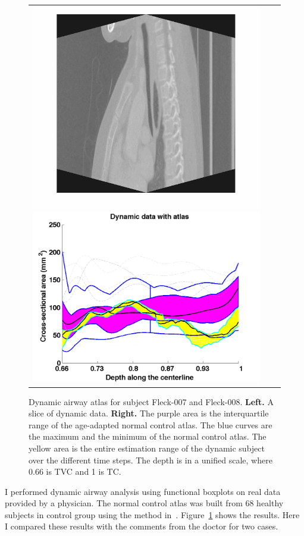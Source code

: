 \begin{figure}[tb]
\begin{center}
\begin{tabular}{ccc}
    \includegraphics[height=\figheight] {fig/Fleck_008.png}
    \includegraphics[width=\figwidth] {fig/Fleck_008_wfbplot.png} \\
    \end{tabular}
    \caption{ \label{fig:Fleck} Dynamic airway atlas for subject Fleck-007 and Fleck-008. {\bf Left.} A slice of dynamic data. {\bf Right.} The purple area is the interquartile range of the age-adapted normal control atlas. The blue curves are the maximum and the minimum of the normal control atlas. The yellow area is the entire estimation range of the dynamic subject over the different time steps. The depth is in a unified scale, where 0.66 is TVC and 1 is TC.
    }
  \end{center}
\end{figure}
I performed dynamic airway analysis using functional boxplots on real data provided by a physician.
The normal control atlas was built from 68 healthy subjects in control group using the method in~\cite{hong2014statistical}.
Figure~\ref{fig:Fleck} shows the results.
Here I compared these results with the comments from the doctor for two cases.

